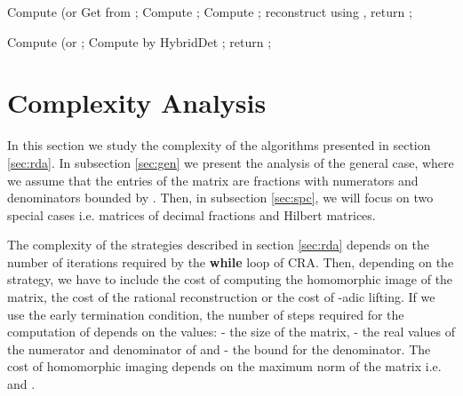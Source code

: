 \documentclass{acm_proc_article-sp}   \usepackage{graphicx,url}
\newcommand{\algrdMat}{PrecMatLU}
\newcommand{\algrdDixon}{PrecMatDixon}
\begin{document}
\begin{algorithm}\caption{\algrdMat}
\begin{algorithmic}[1]
\STATE  \STATE Compute  (or
 \REPEAT \STATE Get  from ; \STATE Compute
; \STATE Compute ; \STATE
reconstruct  using ,   \UNTIL{} \STATE
return ;
\end{algorithmic}
\end{algorithm}

\begin{algorithm}\caption{\algrdDixon}
\begin{algorithmic}[1]
\STATE Compute  (or ;
\STATE Compute  by HybridDet \cite{jgd:2006:det};
\STATE return ;
\end{algorithmic}
\end{algorithm}

















\section{Complexity Analysis}\label{sec:cpl}

In this section we study the complexity of the algorithms presented in section \ref{sec:rda}. In subsection \ref{sec:gen} we present the analysis of the general case, where we assume that the entries of the matrix are fractions with numerators and denominators bounded by . Then, in subsection \ref{sec:spc}, we will focus on two special cases i.e. matrices of decimal fractions and Hilbert matrices.



The complexity of the strategies described in section \ref{sec:rda}
depends on the number of iterations required by the {\bf while}
loop of CRA. Then, depending on the strategy, we have to include the
cost of computing the homomorphic image of the matrix, the cost of the rational reconstruction or the cost of -adic lifting. If we use the early termination condition, the number of steps required for the computation of  depends on the values:  - the size of the matrix,  - the real values of the numerator and denominator of  and  - the bound for the denominator. The cost of homomorphic imaging depends on the maximum norm of the matrix i.e.  and .
\end{document}
